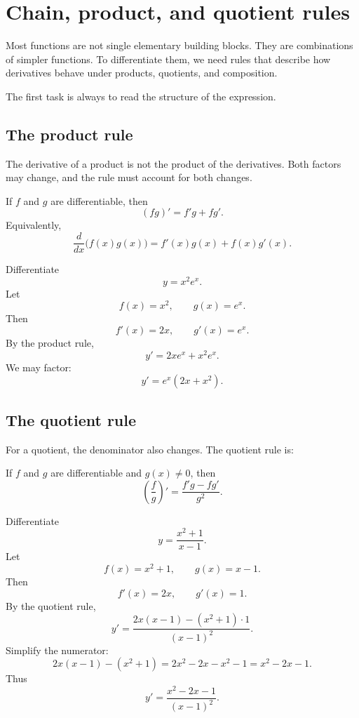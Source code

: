 \section{Chain, product, and quotient rules}

Most functions are not single elementary building blocks. They are combinations of simpler functions. To differentiate them, we need rules that describe how derivatives behave under products, quotients, and composition.

The first task is always to read the structure of the expression.

\subsection*{The product rule}

The derivative of a product is not the product of the derivatives. Both factors may change, and the rule must account for both changes.

\begin{theorembox}
If \(f\) and \(g\) are differentiable, then
\[
(fg)'=f'g+fg'.
\]
Equivalently,
\[
\frac{d}{dx}\bigl(f(x)g(x)\bigr)=f'(x)g(x)+f(x)g'(x).
\]
\end{theorembox}

\begin{examplebox}
Differentiate
\[
y=x^2e^x.
\]
Let
\[
f(x)=x^2,
\qquad
 g(x)=e^x.
\]
Then
\[
f'(x)=2x,
\qquad
 g'(x)=e^x.
\]
By the product rule,
\[
y'=2x e^x+x^2 e^x.
\]
We may factor:
\[
y'=e^x(2x+x^2).
\]
\end{examplebox}

\subsection*{The quotient rule}

For a quotient, the denominator also changes. The quotient rule is:

\begin{theorembox}
If \(f\) and \(g\) are differentiable and \(g(x)\ne0\), then
\[
\left(\frac{f}{g}\right)'=\frac{f'g-fg'}{g^2}.
\]
\end{theorembox}

\begin{examplebox}
Differentiate
\[
y=\frac{x^2+1}{x-1}.
\]
Let
\[
f(x)=x^2+1,
\qquad
 g(x)=x-1.
\]
Then
\[
f'(x)=2x,
\qquad
 g'(x)=1.
\]
By the quotient rule,
\[
y'=\frac{2x(x-1)-(x^2+1)\cdot1}{(x-1)^2}.
\]
Simplify the numerator:
\[
2x(x-1)-(x^2+1)=2x^2-2x-x^2-1=x^2-2x-1.
\]
Thus
\[
y'=\frac{x^2-2x-1}{(x-1)^2}.
\]
\end{examplebox}

